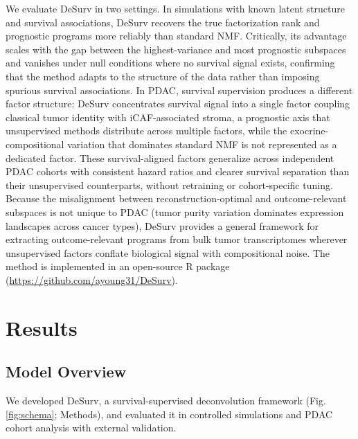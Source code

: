 \documentclass[9pt,twocolumn,twoside,]{pnas-new}
\begin{document}
We evaluate DeSurv in two settings. In simulations with known latent
structure and survival associations, DeSurv recovers the true
factorization rank and prognostic programs more reliably than standard
NMF. Critically, its advantage scales with the gap between the
highest-variance and most prognostic subspaces and vanishes under null
conditions where no survival signal exists, confirming that the method
adapts to the structure of the data rather than imposing spurious
survival associations. In PDAC, survival supervision produces a
different factor structure: DeSurv concentrates survival signal into a
single factor coupling classical tumor identity with iCAF-associated
stroma, a prognostic axis that unsupervised methods distribute across
multiple factors, while the exocrine-compositional variation that
dominates standard NMF is not represented as a dedicated factor. These
survival-aligned factors generalize across independent PDAC cohorts with
consistent hazard ratios and clearer survival separation than their
unsupervised counterparts, without retraining or cohort-specific tuning.
Because the misalignment between reconstruction-optimal and
outcome-relevant subspaces is not unique to PDAC (tumor purity variation
dominates expression landscapes across cancer types), DeSurv provides a
general framework for extracting outcome-relevant programs from bulk
tumor transcriptomes wherever unsupervised factors conflate biological
signal with compositional noise. The method is implemented in an
open-source R package (\url{https://github.com/ayoung31/DeSurv}).

\section*{Results}\label{results}

\subsection*{Model Overview}\label{model-overview}

We developed DeSurv, a survival-supervised deconvolution framework (Fig.
\ref{fig:schema}; Methods), and evaluated it in controlled simulations
and PDAC cohort analysis with external validation.
\end{document}
